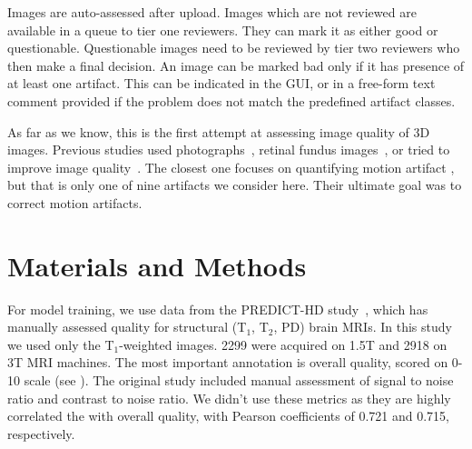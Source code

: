 \documentclass{midl} %
\begin{document}
Images are auto-assessed after upload.
Images which are not reviewed are available in a queue to tier one reviewers. 
They can mark it as either good or questionable. Questionable images need to be reviewed by tier two reviewers who then make a final decision. An image can be marked bad only if it has presence of at least one artifact. This can be indicated in the GUI, or in a free-form text comment provided if the problem does not match the predefined artifact classes.


As far as we know, this is the first attempt at assessing image quality of 3D images. Previous studies used photographs~\cite{bosse2017deep,hosu2020koniq}, retinal fundus images~\cite{yu2017image},
or tried to improve image quality~\cite{higaki2019improvement}. The closest one focuses on quantifying motion artifact \cite{butskova2021adversarial}, but that is only one of nine artifacts we consider here. Their ultimate goal was to correct motion artifacts. %

\section{Materials and Methods}

For model training, we use data from the PREDICT-HD study~\cite{paulsen2014clinical}, which has manually assessed quality for structural (T$_1$, T$_2$, PD) brain MRIs. In this study we used only the T$_1$-weighted images. 2299 were acquired on 1.5T and 2918 on 3T MRI machines.
The most important annotation is overall quality, scored on 0-10 scale (see ). The original study included manual assessment of signal to noise ratio and contrast to noise ratio. We didn't use these metrics as they are highly correlated the with overall quality, with Pearson coefficients of 0.721 and 0.715, respectively.
\end{document}
